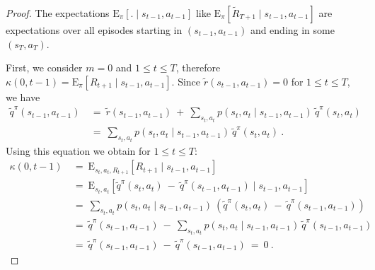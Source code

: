 \documentclass{article}
\newcommand\EXP{\mathbf{\mathrm{E}}}
\renewcommand{\leq}{\leqslant}
\begin{document}
\begin{appendices}
\begin{proof}
The expectations
$\EXP_{\pi}\left[.\mid  s_{t-1},a_{t-1}\right]$
like
$\EXP_{\pi}\left[\tilde{R}_{T+1}\mid  s_{t-1},a_{t-1}\right]$
are expectations over all episodes starting in $(s_{t-1},a_{t-1})$
and ending in some $(s_T,a_T)$.

First, we consider $m=0$ and  $1 \leq t\leq T$, therefore
$\kappa(0,t-1)=\EXP_{\pi} \left[R_{t+1}  \mid s_{t-1}, a_{t-1} \right]$.
Since  $\tilde{r}(s_{t-1},a_{t-1})=0$ for $1 \leq t\leq T$, we have
\begin{align}
  \tilde{q}^\pi(s_{t-1},a_{t-1}) \ &= \  
  \tilde{r}(s_{t-1},a_{t-1})\ + \ \sum_{s_t,a_t} p(s_t,a_t \mid s_{t-1}, a_{t-1}) \ 
  \tilde{q}^\pi(s_t,a_t) \\ \nonumber
  &= \ 
  \sum_{s_t,a_t} p(s_t,a_t \mid s_{t-1}, a_{t-1}) \ \tilde{q}^\pi(s_t,a_t) \ .
\end{align} 
Using this equation we obtain for $1 \leq t\leq T$:
\begin{align}
  \kappa(0,t-1) \ &= \
  \EXP_{s_t,a_t,R_{t+1}} \left[ R_{t+1}  \mid s_{t-1}, a_{t-1} \right] \\ \nonumber
  &= \ \EXP_{s_t,a_t} \left[ \tilde{q}^\pi(s_t,a_t) \ - \  
  \tilde{q}^\pi(s_{t-1},a_{t-1})  \mid s_{t-1}, a_{t-1} \right] \\ \nonumber
  &= \ \sum_{s_t,a_t} p(s_t,a_t \mid s_{t-1}, a_{t-1}) \ 
  \left( \tilde{q}^\pi(s_t,a_t) \ - \  
  \tilde{q}^\pi(s_{t-1},a_{t-1}) \right) \\ \nonumber
  &= \ \tilde{q}^\pi(s_{t-1},a_{t-1}) \ - \ 
  \sum_{s_t,a_t} p(s_t,a_t \mid s_{t-1}, a_{t-1}) \  
  \tilde{q}^\pi(s_{t-1},a_{t-1}) \\ \nonumber
  &= \ \tilde{q}^\pi(s_{t-1},a_{t-1}) \ - \ \tilde{q}^\pi(s_{t-1},a_{t-1})  
  \ = \  0 \ .
\end{align} 


\end{proof}
\end{appendices}
\end{document}
